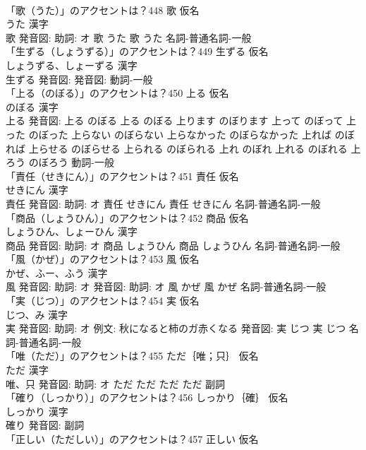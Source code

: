 \documentclass[8pt]{extreport}
\begin{document}
\begin{CJK}{UTF8}{min}
\\	「歌（うた）」のアクセントは？448	歌 仮名　
\\	うた 漢字　
\\	歌 発音図: 助詞: オ	歌 うた		歌 うた				名詞-普通名詞-一般 
\\	「生ずる（しょうずる）」のアクセントは？449	生ずる 仮名　
\\	しょうずる、しょーずる 漢字　
\\	生ずる 発音図: 発音図:							動詞-一般 
\\	「上る（のぼる）」のアクセントは？450	上る 仮名　
\\	のぼる 漢字　
\\	上る 発音図:	上る のぼる		上る のぼる 上ります のぼります 上って のぼって 上った のぼった 上らない のぼらない 上らなかった のぼらなかった 上れば のぼれば 上らせる のぼらせる 上られる のぼられる 上れ のぼれ 上れる のぼれる 上ろう のぼろう				動詞-一般 
\\	「責任（せきにん）」のアクセントは？451	責任 仮名　
\\	せきにん 漢字　
\\	責任 発音図: 助詞: オ	責任 せきにん		責任 せきにん				名詞-普通名詞-一般 
\\	「商品（しょうひん）」のアクセントは？452	商品 仮名　
\\	しょうひん、しょーひん 漢字　
\\	商品 発音図: 助詞: オ	商品 しょうひん		商品 しょうひん				名詞-普通名詞-一般 
\\	「風（かぜ）」のアクセントは？453	風 仮名　
\\	かぜ、ふー、ふう 漢字　
\\	風 発音図: 助詞: オ 発音図: 助詞: オ	風 かぜ		風 かぜ				名詞-普通名詞-一般 
\\	「実（じつ）」のアクセントは？454	実 仮名　
\\	じつ、み 漢字　
\\	実 発音図: 助詞: オ 例文: 秋になると柿のガ赤くなる 発音図:	実 じつ		実 じつ				名詞-普通名詞-一般 
\\	「唯（ただ）」のアクセントは？455	ただ｛唯；只｝ 仮名　
\\	ただ 漢字　
\\	唯、只 発音図: 助詞: オ	ただ ただ		ただ ただ				副詞 
\\	「確り（しっかり）」のアクセントは？456	しっかり｛確｝ 仮名　
\\	しっかり 漢字　
\\	確り 発音図:							副詞 
\\	「正しい（ただしい）」のアクセントは？457	正しい 仮名　

\end{CJK}
\end{document}
